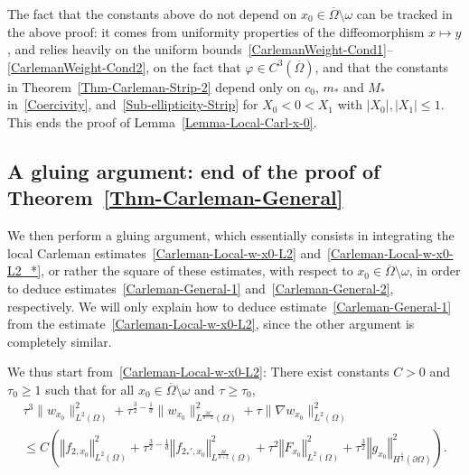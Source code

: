 \documentclass[10pt]{amsart}
\theoremstyle{definition}\newtheorem{defi}[theo]{Definition}\newtheorem{rema}[theo]{Remark}\newtheorem{exam}[theo]{Example}\newtheorem{exem}[theo]{Example}\newtheorem{nota}[theo]{Notation}
\newcommand{\norm}[1]{\left\Vert#1\right\Vert}
\renewcommand{\leq}{\leqslant}
\renewcommand{\geq}{\geqslant}
\begin{document}
The fact that the constants above do not depend on $x_0 \in \overline\Omega \setminus \omega$ can be tracked in the above proof: it comes from uniformity properties of the diffeomorphism $x \mapsto y$, and relies heavily on the uniform bounds~\eqref{CarlemanWeight-Cond1}--\eqref{CarlemanWeight-Cond2}, on the fact that $\varphi \in C^3(\overline\Omega)$, and that the constants in Theorem~\ref{Thm-Carleman-Strip-2} depend only on $c_0$, $m_*$ and $M_*$ in~\eqref{Coercivity}, and~\eqref{Sub-ellipticity-Strip} for $X_0 < 0 < X_1$ with $|X_0|, |X_1| \leq 1$. This ends the proof of Lemma~\ref{Lemma-Local-Carl-x-0}.



\subsection{A gluing argument: end of the proof of Theorem~\ref{Thm-Carleman-General}}\label{Sec-Gluing}

We then perform a gluing argument, which essentially consists in integrating the local Carleman estimates~\eqref{Carleman-Local-w-x0-L2} and~\eqref{Carleman-Local-w-x0-L2_*}, or rather the square of these estimates, with respect to $x_0 \in \overline\Omega \setminus \omega$, in order to deduce estimates~\eqref{Carleman-General-1} and~\eqref{Carleman-General-2}, respectively. We will only explain how to deduce estimate~\eqref{Carleman-General-1} from the estimate~\eqref{Carleman-Local-w-x0-L2}, since the other argument is completely similar.

We thus start from~\eqref{Carleman-Local-w-x0-L2}: There exist constants $C>0$ and $\tau_0 \geq 1$ such that for all $x_0 \in \overline\Omega \setminus \omega$ and $\tau \geq \tau_0$,
\begin{multline*}
\tau^{3} \| w_{x_0} \|_{L^2(\Omega)}^2 +
\tau^{\frac{3}{2}-\frac{1}{d}} \| w_{x_0} \|_{L^{\frac{2d}{d-2}}(\Omega)}^2 +
\tau \| \nabla w_{x_0} \|_{L^2(\Omega)}^2
\\
\leq C\left(
\norm{f_{2,x_0}}_{L^2(\Omega)} ^2 +
\tau^{\frac{3}{2}-\frac{1}{d}} \norm{f_{2_*',x_0} }_{L^{\frac{2d}{d+2}}(\Omega)}^2 +
\tau^2 \norm{F_{x_0}}_{L^2(\Omega)}^2 +
\tau^{\frac{3}{2}} \norm{g_{x_0}}_{H^{\frac{1}{2}}(\partial\Omega)}^2
\right).
\end{multline*}
\end{document}
